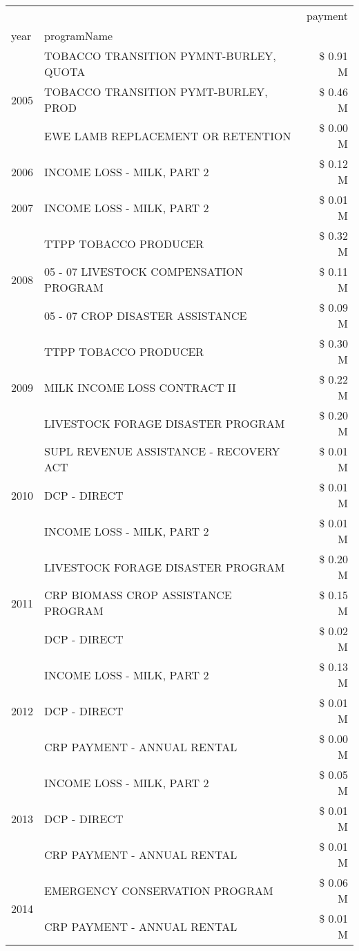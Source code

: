 \begin{tabular}{llr}
\toprule
 &  & payment \\
year & programName &  \\
\midrule
\multirow[t]{3}{*}{2005} & TOBACCO TRANSITION PYMNT-BURLEY, QUOTA & \$ 0.91 M \\
 & TOBACCO TRANSITION PYMT-BURLEY, PROD & \$ 0.46 M \\
 & EWE LAMB REPLACEMENT OR RETENTION & \$ 0.00 M \\
\cline{1-3}
2006 & INCOME LOSS - MILK, PART 2 & \$ 0.12 M \\
\cline{1-3}
2007 & INCOME LOSS - MILK, PART 2 & \$ 0.01 M \\
\cline{1-3}
\multirow[t]{3}{*}{2008} & TTPP TOBACCO PRODUCER & \$ 0.32 M \\
 & 05 - 07 LIVESTOCK COMPENSATION PROGRAM & \$ 0.11 M \\
 & 05 - 07 CROP DISASTER ASSISTANCE & \$ 0.09 M \\
\cline{1-3}
\multirow[t]{3}{*}{2009} & TTPP TOBACCO PRODUCER & \$ 0.30 M \\
 & MILK INCOME LOSS CONTRACT II & \$ 0.22 M \\
 & LIVESTOCK FORAGE DISASTER  PROGRAM & \$ 0.20 M \\
\cline{1-3}
\multirow[t]{3}{*}{2010} & SUPL REVENUE ASSISTANCE - RECOVERY ACT & \$ 0.01 M \\
 & DCP - DIRECT & \$ 0.01 M \\
 & INCOME LOSS - MILK, PART 2 & \$ 0.01 M \\
\cline{1-3}
\multirow[t]{3}{*}{2011} & LIVESTOCK FORAGE DISASTER PROGRAM & \$ 0.20 M \\
 & CRP BIOMASS CROP ASSISTANCE PROGRAM & \$ 0.15 M \\
 & DCP - DIRECT & \$ 0.02 M \\
\cline{1-3}
\multirow[t]{3}{*}{2012} & INCOME LOSS - MILK, PART 2 & \$ 0.13 M \\
 & DCP - DIRECT & \$ 0.01 M \\
 & CRP PAYMENT - ANNUAL RENTAL & \$ 0.00 M \\
\cline{1-3}
\multirow[t]{3}{*}{2013} & INCOME LOSS - MILK, PART 2 & \$ 0.05 M \\
 & DCP - DIRECT & \$ 0.01 M \\
 & CRP PAYMENT - ANNUAL RENTAL & \$ 0.01 M \\
\cline{1-3}
\multirow[t]{3}{*}{2014} & EMERGENCY CONSERVATION PROGRAM & \$ 0.06 M \\
 & CRP PAYMENT - ANNUAL RENTAL & \$ 0.01 M \\

\end{tabular}
